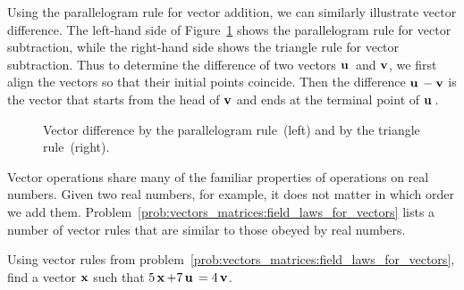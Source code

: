 Using the parallelogram rule for vector addition, we can similarly
illustrate vector difference. The left-hand side of
Figure~\ref{fig:vectors_matrices:vector_difference_parallelogram_triangle} shows the
parallelogram rule for vector subtraction, while the right-hand side shows
the triangle rule for vector subtraction. Thus to determine the
difference of two vectors $\operatorname*{\mathbf{u}}{}$ and $\operatorname*{\mathbf{v}}$, we first align the
vectors so that their initial points coincide. Then the difference
$\operatorname*{\mathbf{u}}{} - \operatorname*{\mathbf{v}}$ is the vector that starts from the head of
$\operatorname*{\mathbf{v}}$ and ends at the terminal point of $\operatorname*{\mathbf{u}}{}$.

\begin{figure}[!htpb]
\centering
{}
\caption{Vector difference by the parallelogram rule~(left) and by the
triangle rule~(right).}
\label{fig:vectors_matrices:vector_difference_parallelogram_triangle}
\end{figure}

Vector operations share many of the familiar properties of operations
on real numbers. Given two real numbers, for example, it does not
matter in which order we add
them. Problem~\ref{prob:vectors_matrices:field_laws_for_vectors} lists
a number of vector rules that are similar to those obeyed by real numbers.

\begin{example}
Using vector rules from
problem~\ref{prob:vectors_matrices:field_laws_for_vectors}, find a
vector $\operatorname*{\mathbf{x}}$ such that $5\operatorname*{\mathbf{x}} + 7\operatorname*{\mathbf{u}}{} = 4\operatorname*{\mathbf{v}}$.
\end{example}


